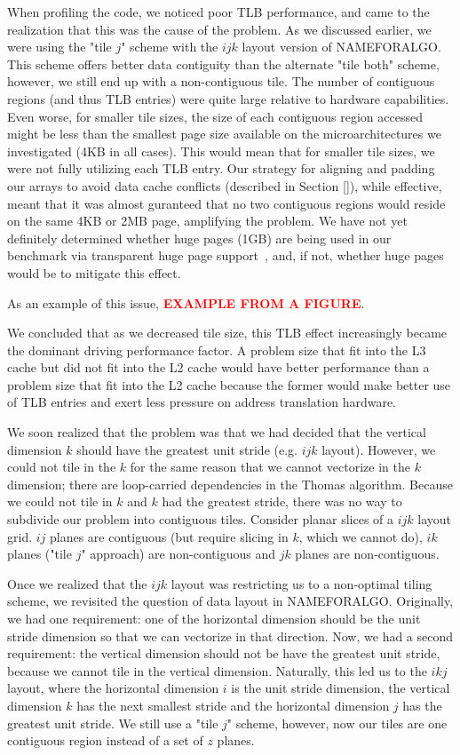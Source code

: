 \documentclass[conference]{IEEEtran}
\newcommand{\fix}[1]{{\bf \textcolor {red}{#1}}}
\begin{document}
When profiling the code, we noticed poor TLB performance, and came to the
realization that this was the cause of the problem. As we discussed earlier, we
were using the "tile \(j\)" scheme with the \(ijk\) layout version of
NAMEFORALGO. This scheme offers better data contiguity than the alternate "tile
both" scheme, however, we still end up with a non-contiguous tile.  The number
of contiguous regions (and thus TLB entries) were quite large relative to
hardware capabilities. Even worse, for smaller tile sizes, the size of each
contiguous region accessed might be less than the smallest page size available
on the microarchitectures we investigated (4KB in all cases). This would mean
that for smaller tile sizes, we were not fully utilizing each TLB entry.  Our
strategy for aligning and padding our arrays to avoid data cache conflicts
(described in Section \ref{}), while effective, meant that it was almost
guranteed that no two contiguous regions would reside on the same 4KB or 2MB
page, amplifying the problem. We have not yet definitely determined whether
huge pages (1GB) are being used in our benchmark via transparent huge page
support~\cite{}, and, if not, whether huge pages would be to mitigate this
effect.

As an example of this issue, \fix{EXAMPLE FROM A FIGURE}.

We concluded that as we decreased tile size, this TLB effect increasingly
became the dominant driving performance factor. A problem size that fit into
the L3 cache but did not fit into the L2 cache would have better performance
than a problem size that fit into the L2 cache because the former would make
better use of TLB entries and exert less pressure on address translation
hardware.

We soon realized that the problem was that we had decided that the
vertical dimension \(k\) should have the greatest unit stride (e.g. \(ijk\)
layout). However, we could not tile in the \(k\) for the same reason that we
cannot vectorize in the \(k\) dimension; there are loop-carried dependencies in
the Thomas algorithm. Because we could not tile in \(k\) and \(k\) had the greatest
stride, there was no way to subdivide our problem into contiguous tiles.
Consider planar slices of a \(ijk\) layout grid. \(ij\) planes are contiguous
(but require slicing in \(k\), which we cannot do), \(ik\) planes ("tile \(j\)"
approach) are non-contiguous and \(jk\) planes are non-contiguous.

Once we realized that the \(ijk\) layout was restricting us to a non-optimal
tiling scheme, we revisited the question of data layout in NAMEFORALGO.
Originally, we had one requirement: one of the horizontal dimension should be
the unit stride dimension so that we can vectorize in that direction. Now, we
had a second requirement: the vertical dimension should not be have the
greatest unit stride, because we cannot tile in the vertical dimension.
Naturally, this led us to the \(ikj\) layout, where the horizontal dimension
\(i\) is the unit stride dimension, the vertical dimension \(k\) has the next
smallest stride and the horizontal dimension \(j\) has the greatest unit
stride. We still use a "tile \(j\)" scheme, however, now our tiles are one
contiguous region instead of a set of \(z\) planes.
\end{document}
